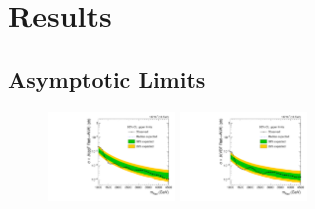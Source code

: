 
\section{Results}
\label{sec:results}

\subsection{Asymptotic Limits}

\begin{figure}[htbp]
  \centering
  \includegraphics[width=0.3\textwidth]{fig/results/limits_RadToWW_o_74.pdf}
  \includegraphics[width=0.3\textwidth]{fig/results/limits_VBFRadToWW_o_74.pdf}
  \caption{
  }
  \label{fig:exclusion_limits_spin0}
\end{figure}

